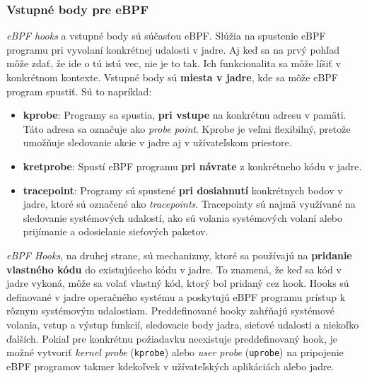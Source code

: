 \subsubsection{Vstupné body pre eBPF}
\label{sec:hooks}
\emph{eBPF hooks} a vstupné body sú súčasťou eBPF. Slúžia na spustenie eBPF programu pri vyvolaní konkrétnej udalosti v jadre. 
Aj keď sa na prvý pohľad môže zdať, že ide o tú istú vec, nie je to tak. Ich funkcionalita sa môže líšiť v konkrétnom kontexte. 
Vstupné body sú \textbf{miesta v jadre}, kde sa môže eBPF program spustiť. Sú to napríklad:
\begin{itemize}
    \item \textbf{kprobe}: Programy sa spustia, \textbf{pri vstupe} na konkrétnu adresu v pamäti. 
    Táto adresa sa označuje ako \emph{probe point}. Kprobe je veľmi flexibilný, pretože umožňuje 
    sledovanie akcie v jadre aj v užívateľskom priestore.
    \item \textbf{kretprobe}: Spustí eBPF programu \textbf{pri návrate} z konkrétneho kódu v jadre.
    \item \textbf{tracepoint}: Programy sú spustené \textbf{pri dosiahnutí} konkrétnych bodov v jadre, 
    ktoré sú označené ako \emph{tracepoints}. Tracepointy sú najmä využívané na sledovanie systémových 
    udalostí, ako sú volania systémových volaní alebo prijímanie a odosielanie sieťových paketov.
\end{itemize}
\emph{eBPF Hooks}, na druhej strane, sú mechanizmy, ktoré sa používajú na \textbf{pridanie vlastného kódu} do existujúceho kódu v jadre. 
To znamená, že keď sa kód v jadre vykoná, môže sa volať vlastný kód, ktorý bol pridaný cez hook. Hooks sú definované v 
jadre operačného systému a poskytujú eBPF programu prístup k rôznym systémovým udalostiam. Preddefinované hooky zahŕňajú 
systémové volania, vstup a výstup funkcií, sledovacie body jadra, sieťové udalosti a niekoľko ďalších. Pokiaľ pre konkrétnu 
požiadavku neexistuje preddefinovaný hook, je možné vytvoriť \emph{kernel probe} (\texttt{kprobe}) alebo \emph{user probe} (\texttt{uprobe}) 
na pripojenie eBPF programov takmer kdekoľvek v užívateľských aplikáciách alebo jadre.

